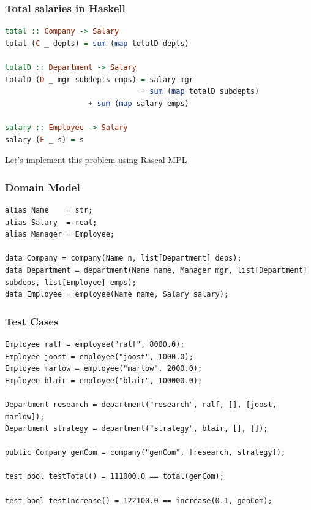 \documentclass{beamer}
\begin{document}
\begin{frame}[fragile]
  \frametitle{Total salaries in Haskell}

  \begin{lstlisting}[language=Haskell]
total :: Company -> Salary
total (C _ depts) = sum (map totalD depts)

totalD :: Department -> Salary
totalD (D _ mgr subdepts emps) = salary mgr
                               + sum (map totalD subdepts)
			       + sum (map salary emps)

salary :: Employee -> Salary
salary (E _ s) = s

  \end{lstlisting} 
\end{frame}

\begin{frame}
 \huge{Let's implement this problem using Rascal-MPL}
\end{frame}


\begin{frame}[fragile]
  \frametitle{Domain Model}

  \begin{lstlisting}[language=Rascal]
alias Name    = str;
alias Salary  = real; 
alias Manager = Employee; 

data Company = company(Name n, list[Department] deps); 
data Department = department(Name name, Manager mgr, list[Department] subdeps, list[Employee] emps); 
data Employee = employee(Name name, Salary salary); 
  \end{lstlisting}  
\end{frame}

\begin{frame}[fragile]
  \frametitle{Test Cases}

  \begin{lstlisting}
Employee ralf = employee("ralf", 8000.0); 
Employee joost = employee("joost", 1000.0);
Employee marlow = employee("marlow", 2000.0);
Employee blair = employee("blair", 100000.0);

Department research = department("research", ralf, [], [joost, marlow]); 
Department strategy = department("strategy", blair, [], []); 

public Company genCom = company("genCom", [research, strategy]);

test bool testTotal() = 111000.0 == total(genCom);

test bool testIncrease() = 122100.0 == increase(0.1, genCom);
  \end{lstlisting}
\end{frame}
\end{document}
